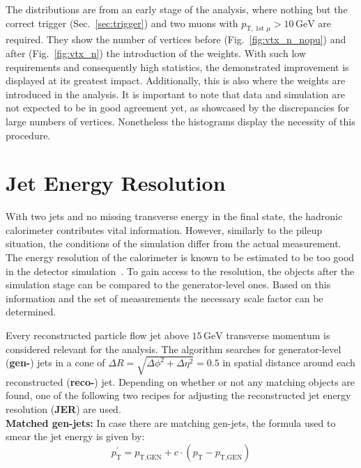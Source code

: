 \noindent The distributions are from an early stage of the analysis, where nothing but the correct trigger (Sec.~\ref{sec:trigger}) and two muons with $p_{\text{T, 1st }\mu} > 10\,\text{GeV}$ are required. They show the number of vertices before (Fig.~\ref{fig:vtx_n_nopu}) and after (Fig.~\ref{fig:vtx_n}) the introduction of the weights. With such low requirements and consequently high statistics, the demonstrated improvement is displayed at its greatest impact. Additionally, this is also where the weights are introduced in the analysis. It is important to note that data and simulation are not expected to be in good agreement yet, as showcased by the discrepancies for large numbers of vertices. Nonetheless the histograms display the necessity of this procedure.


\section{Jet Energy Resolution}
\label{sec:jer}

With two jets and no missing transverse energy in the final state, the hadronic calorimeter contributes vital information. However, similarly to the pileup situation, the conditions of the simulation differ from the actual measurement. The energy resolution of the calorimeter is known to be estimated to be too good in the detector simulation~\cite{jer}. To gain access to the resolution, the objects after the simulation stage can be compared to the generator-level ones. Based on this information and the set of measurements the necessary scale factor can be determined.

Every reconstructed particle flow jet above $15\,\text{GeV}$ transverse momentum is considered relevant for the analysis. The algorithm searches for generator-level (\textbf{gen-}) jets in a cone of $\Delta R = \sqrt{\Delta\phi^2 + \Delta\eta^2} = 0.5$ in spatial distance around each reconstructed (\textbf{reco-}) jet. Depending on whether or not any matching objects are found, one of the following two recipes for adjusting the reconstructed jet energy resolution (\textbf{JER}) are used. \\


\textbf{Matched gen-jets:} In case there are matching gen-jets, the formula used to smear the jet energy is given by:
\begin{equation}
  \label{eq:jermatched}
  p^\prime_{\text{T}} = p_{\text{T}, \text{GEN}} + c \cdot (p_{\text{T}} - p_{\text{T}, \text{GEN}})
\end{equation}
  
